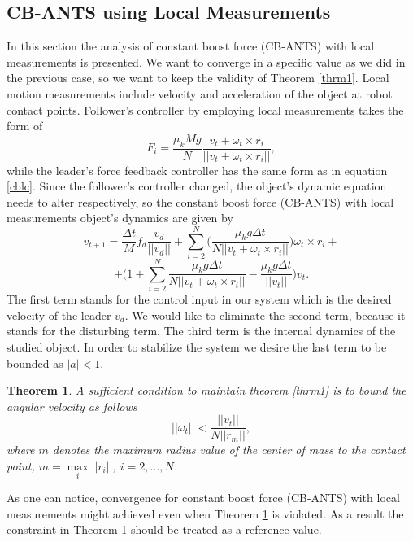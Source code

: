 \documentclass[letterpaper, 10 pt, conference]{ieeeconf}
\newtheorem{theorem}{\textbf{Theorem}}
\begin{document}
\subsection{CB-ANTS using Local Measurements}\label{cblm}
In this section the analysis of constant boost force (CB-ANTS) with local measurements is presented. We want to converge in a specific value as we did in the previous case, so we want to keep the validity of Theorem \ref{thrm1}. Local motion measurements include velocity and acceleration of the object at robot contact points. Follower's controller by employing local measurements takes the form of
\begin{equation}
F_i=\frac{\mu_kMg}{N}\frac{v_t+\omega_t\times r_i}{||v_t+\omega_t\times r_i||},
\end{equation}
while the leader's force feedback controller has the same form as in equation \ref{cblc}. Since the follower's controller changed, the object's dynamic equation needs to alter respectively, so the constant boost force (CB-ANTS) with local measurements object's dynamics are given by
\begin{equation*}
v_{t+1}= \frac{\Delta t}{M}f_d\frac{v_d}{||v_d||}+\sum_{i=2}^N \bigg(\frac{\mu_k g \Delta t}{N||v_t+\omega_t \times r_i||} \bigg) \omega_t \times r_i+
\end{equation*}
\begin{equation}\label{cblmd}
+\Bigg(1+\sum_{i=2}^N \frac{\mu_k g \Delta t}{N||v_t + \omega_t \times r_i||}-\frac{\mu_k g \Delta t}{||v_t||}\Bigg)v_t.
\end{equation}
The first term stands for the control input in our system which is the desired velocity of the leader $v_d$. We would like to eliminate the second term, because it stands for the disturbing term. The third term is the internal dynamics of the studied object. In order to stabilize the system we desire the last term to be bounded as $|a|<1$.\vspace{.2cm}
\begin{theorem}\label{thrm3}
\textit{A sufficient condition to maintain theorem \ref{thrm1} is to bound the angular velocity as follows
\begin{equation}
||\omega_t||<\frac{||v_t||}{N||r_m||},
\end{equation}
where $m$ denotes the maximum radius value of the center of mass to the contact point, $m=\max\limits_{i}||r_i||$, $i=2,\hdots,N$.
} \vspace{.2cm}
\end{theorem}
As one can notice, convergence for constant boost force (CB-ANTS) with local measurements might achieved even when Theorem \ref{thrm3} is violated. As a result the constraint in Theorem \ref{thrm3} should be treated as a reference value.\vspace{.2cm}
\end{document}
